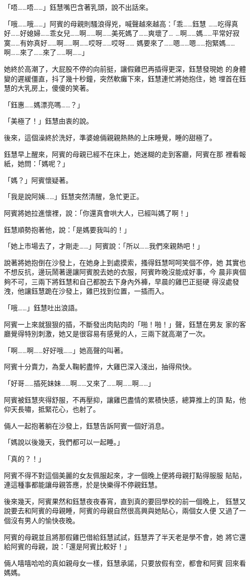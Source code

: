 「唔……唔……」鈺慧嘴巴含著乳頭，說不出話來。

「哦……哦……」阿賓的母親則騷浪得兇，喊聲越來越高：「乖……鈺慧
……吃得真好……好媳婦……乖女兒……啊……啊……美死媽了……爽壞了…
…啊……媽……平常好寂寞……有妳真好……啊……啊……哎呀……哎呀……
媽要來了……嗯……嗯……抱緊媽……啊……來了……來了……啊……」

她終於高潮了，大屁股不停的向前挺，讓假雞巴再插得更深，鈺慧發現她
的身體變的遲緩僵直，抖了幾十秒鐘，突然軟癱下來，鈺慧連忙將她抱住，她
埋首在鈺慧的大乳房上，傻傻的笑著。

「鈺惠……媽漂亮嗎……？」

「美極了！」鈺慧由衷的說。

後來，這個澡終於洗好，準婆媳倆親親熱熱的上床睡覺，睡的甜極了。

鈺慧早上醒來，阿賓的母親已經不在床上，她迷糊的走到客廳，阿賓在那
裡看報紙，她問：「媽呢？」

「媽？」阿賓懷疑著。

「我是說阿姨……」鈺慧突然清醒，急忙更正。

阿賓將她拉進懷裡，說：「你還真會哄大人，已經叫媽了啊！」

鈺慧順勢抱著他，說：「是媽要我叫的！」

「她上市場去了，才剛走……」阿賓說：「所以……我們來親熱吧！」

說著將她抱倒在沙發上，在她身上到處摸索，搔得鈺慧呵呵笑個不停，她
其實也不想反抗，邊玩鬧著邊讓阿賓脫去她的衣服，阿賓昨晚沒能成好事，今
晨非爽個夠不可，三兩下將鈺慧和自己都脫去下身內外褲，早晨的雞巴正挺硬
得沒處發洩，他讓鈺慧跪在沙發上，雞巴找到位置，一插而入。

「哦……」鈺慧吐出浪語。

阿賓一上來就狠狠的插，不斷發出肉貼肉的「啪！啪！」聲，鈺慧在男友
家的客廳覺得特別刺激，她又是很容易有感覺的人，三兩下就高潮了一次。

「啊……啊……好好哦……」她高聲的叫著。

阿賓十分賣力，為愛人鞠躬盡悴，大雞巴深入淺出，抽得飛快。

「好哥……插死妹妹……啊……又來了……啊……啊……」

阿賓被鈺慧夾得舒服，不再壓抑，讓雞巴盡情的累積快感，總算推上的頂
點，他仰天長嘯，抵緊花心，也射了。

倆人一起抱著躺在沙發上，鈺慧告訴阿賓一個好消息。

「媽說以後幾天，我們都可以一起睡。」

「真的？！」

阿賓不得不對這個美麗的女友佩服起來，才一個晚上便將母親打點得服服
貼貼，連這種事都能讓母親答應，於是快樂得不停親鈺慧。

後來幾天，阿賓果然和鈺慧夜夜春宵，直到真的要回學校的前一個晚上，
鈺慧又說要去和阿賓的母親睡，阿賓的母親自然很高興與她貼心，兩個女人便
又過了一個沒有男人的愉快夜晚。

阿賓的母親並且將那假雞巴借給鈺慧試試，鈺慧弄了半天老是學不會，她
將它還給阿賓的母親，說：「還是阿賓比較好！」

倆人嘻嘻哈哈的真如親母女一樣，鈺慧承諾，只要放假有空，都會和阿賓
回來看媽媽。










